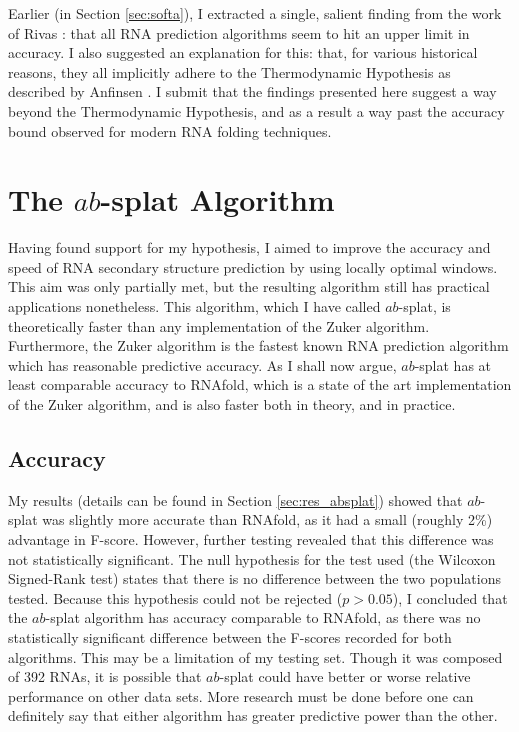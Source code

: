 \documentclass{cshonours}
\begin{document}
Earlier (in Section \ref{sec:softa}), I extracted a single, salient finding from the work of Rivas \cite{rivas2013four}: that all RNA prediction algorithms seem to hit an upper limit in accuracy. I also suggested an explanation for this: that, for various historical reasons, they all implicitly adhere to the Thermodynamic Hypothesis as described by Anfinsen \cite{anfinsen1973principles}. I submit that the findings presented here suggest a way beyond the Thermodynamic Hypothesis, and as a result a way past the accuracy bound observed for modern RNA folding techniques.


\section{The $ab$-splat Algorithm}

Having found support for my hypothesis, I aimed to improve the accuracy and speed of RNA secondary structure prediction by using locally optimal windows. This aim was only partially met, but the resulting algorithm still has practical applications nonetheless. This algorithm, which I have called $ab$-splat, is theoretically faster than any implementation of the Zuker algorithm. Furthermore, the Zuker algorithm is the fastest known RNA prediction algorithm which has reasonable predictive accuracy. As I shall now argue, $ab$-splat has at least comparable accuracy to RNAfold, which is a state of the art implementation of the Zuker algorithm, and is also faster both in theory, and in practice.

\subsection{Accuracy}

My results (details can be found in Section \ref{sec:res_absplat}) showed that $ab$-splat was slightly more accurate than RNAfold, as it had a small (roughly 2\%) advantage in F-score. However, further testing revealed that this difference was not statistically significant. The null hypothesis for the test used (the Wilcoxon Signed-Rank test) states that there is no difference between the two populations tested. Because this hypothesis could not be rejected ($p > 0.05$), I concluded that the $ab$-splat algorithm has accuracy comparable to RNAfold, as there was no statistically significant difference between the F-scores recorded for both algorithms. This may be a limitation of my testing set. Though it was composed of 392 RNAs, it is possible that $ab$-splat could have better or worse relative performance on other data sets. More research must be done before one can definitely say that either algorithm has greater predictive power than the other.
\end{document}
